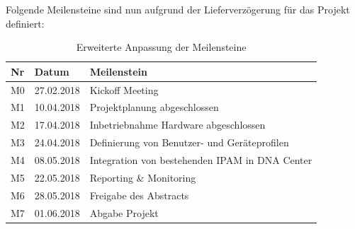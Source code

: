 Folgende Meilensteine sind nun aufgrund der Lieferverzögerung für das Projekt definiert:
\begin{table}[H]
	\centering
	\begin{tabularx}{\textwidth}{p{1cm}| p{2.5cm}| X}
		\rowcolor{gray!50}
		\textbf{Nr} & \textbf{Datum} & \textbf{Meilenstein} \\
		\hline	
		M0 & 27.02.2018 & Kickoff Meeting \\
		M1 & 10.04.2018 & Projektplanung abgeschlossen \\
		M2 & 17.04.2018 & Inbetriebnahme Hardware abgeschlossen \\
		M3 & 24.04.2018 & Definierung von Benutzer- und Geräteprofilen \\
		M4 & 08.05.2018 & Integration von bestehenden IPAM in DNA Center \\
		M5 & 22.05.2018 & Reporting \& Monitoring \\
		M6 & 28.05.2018 & Freigabe des Abstracts \\
		M7 & 01.06.2018 & Abgabe Projekt \\
	\end{tabularx}
	\caption{Erweiterte Anpassung der Meilensteine}
	\label{tab:Erweiterte Anpassung der Meilensteine}
\end{table}






